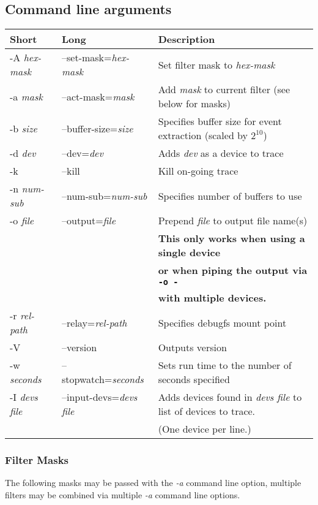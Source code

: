 \documentclass{article}
\begin{document}
\subsection{\label{sec:blktrace-args}Command line arguments}
\begin{tabular}{|l|l|l|}\hline
Short              & Long                       & Description \\ \hline\hline
-A \emph{hex-mask} & --set-mask=\emph{hex-mask} & Set filter mask to \emph{hex-mask} \\ \hline
-a \emph{mask}     & --act-mask=\emph{mask}     & Add \emph{mask} to current filter (see below for masks) \\ \hline
-b \emph{size}     & --buffer-size=\emph{size}  & Specifies buffer size for event extraction (scaled by $2^{10}$) \\ \hline
-d \emph{dev}      & --dev=\emph{dev}           & Adds \emph{dev} as a device to trace \\ \hline
-k                 & --kill                     & Kill on-going trace \\ \hline
-n \emph{num-sub}  & --num-sub=\emph{num-sub}   & Specifies number of buffers to use \\ \hline
-o \emph{file}     & --output=\emph{file}       & Prepend \emph{file} to output file name(s) \\
                   &                            & \textbf{This only works when using a single device} \\
                   &                            & \textbf{or when piping the output via \texttt{-o -}} \\
                   &                            & \textbf{with multiple devices.} \\ \hline
-r \emph{rel-path} & --relay=\emph{rel-path}    & Specifies debugfs mount point \\ \hline
-V                 & --version                  & Outputs version \\ \hline
-w \emph{seconds}  & --stopwatch=\emph{seconds} & Sets run time to the number of seconds specified \\ \hline
-I \emph{devs file}& --input-devs=\emph{devs file}& Adds devices found in \emph{devs file} to list of devices to trace. \\
                   &                              & (One device per line.) \\ \hline
\end{tabular}

\subsubsection{\label{sec:filter-mask}Filter Masks}
The following masks may be passed with the \emph{-a} command line
option, multiple filters may be combined via multiple \emph{-a} command
line options.\smallskip
\end{document}

